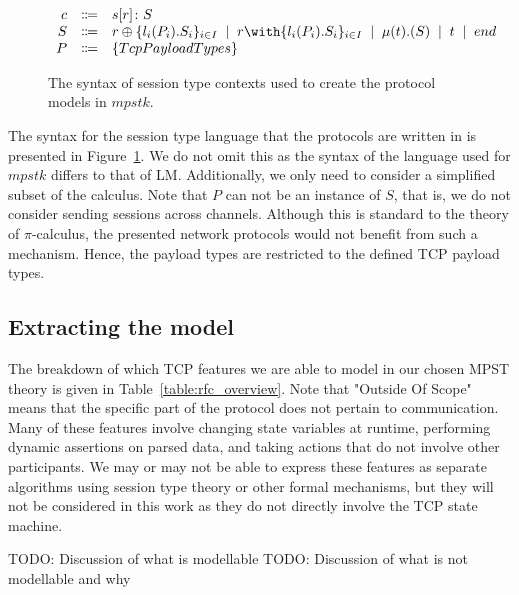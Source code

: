 \documentclass{article}
\newcommand{\todo}[1]{}
\renewcommand{\todo}[1]{{\color{red} TODO: {#1}}}
\newcommand{\sep}{\;\mid\;}
\begin{document}
\begin{figure}[H]
    \centering
        $
        \begin{array}{rcll}
        \ensuremath{c} & \Coloneqq & \ensuremath{s[r] \colon S} \\
        \ensuremath{S}
            & \Coloneqq & \ensuremath{r \oplus \{l_i(P_i).S_i\}_{i \in I}}
            \sep        \ensuremath{r \with \{l_i(P_i).S_i\}_{i \in I}}
            \sep        \ensuremath{\mu(t).(S)}
            \sep        \ensuremath{t}
            \sep        \ensuremath{end} \\
        \ensuremath{P}
            & \Coloneqq & \ensuremath{\{TcpPayloadTypes\}}
        \end{array}
        $
    \caption{The syntax of session type contexts used to create the protocol models in \ensuremath{mpstk}.} \label{fig:syntax}
\end{figure}

The syntax for the session type language that the protocols are written in is presented in Figure~\ref{fig:syntax}.
We do not omit this as the syntax of the language used for \ensuremath{mpstk} differs to that of LM.
Additionally, we only need to consider a simplified subset of the calculus.
Note that \ensuremath{P} can not be an instance of \ensuremath{S}, that is, we do not consider sending sessions across channels.
Although this is standard to the theory of \ensuremath{\pi}-calculus, the presented network protocols would not benefit from such a mechanism.
Hence, the payload types are restricted to the defined TCP payload types.

\subsection{Extracting the model}

The breakdown of which TCP features we are able to model in our chosen MPST theory is given in Table~\ref{table:rfc_overview}.
Note that "Outside Of Scope" means that the specific part of the protocol does not pertain to communication.
Many of these features involve changing state variables at runtime, performing dynamic assertions on parsed data, and taking actions that do not involve other participants.
We may or may not be able to express these features as separate algorithms using session type theory or other formal mechanisms, but they will not be considered in this work as they do not directly involve the TCP state machine.

\todo{Discussion of what is modellable}
\todo{Discussion of what is not modellable and why}
\end{document}
